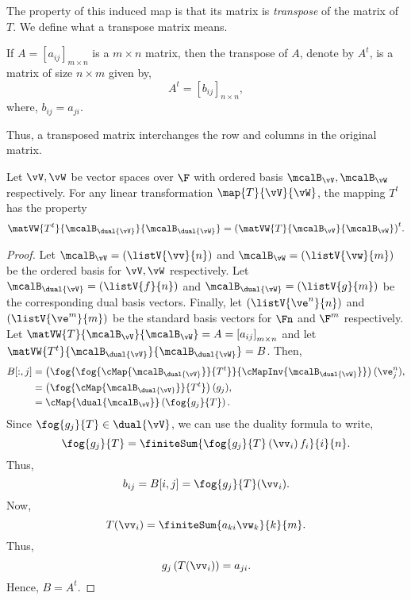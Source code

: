 The property of this induced map is that its matrix is \emph{transpose}
of the matrix of $T$. We define what a transpose matrix means.
\begin{Definition}
    If $A = {\left[a_{ij}\right]}_{m \times n}$ is a $m\times n$ matrix, then the transpose of 
    $A$, denote by $A^{t}$, is a matrix of size $n \times m$ given by,
    \[A^{t} = {\left[b_{ij}\right]}_{n \times n},\]
    where, $b_{ij} = a_{ji}$.
\end{Definition}
Thus, a transposed matrix interchanges the row and columns in the original matrix.
\begin{Theorem}
    Let $\vV,\vW$ be vector spaces over $\F$ with ordered basis $\mcalB_{\vV},\mcalB_{\vW}$ respectively.
    For any linear transformation $\map{T}{\vV}{\vW}$, the mapping $T^{t}$ has the property
    \[\matVW{T^{t}}{\mcalB_{\dual{\vV}}}{\mcalB_{\dual{\vW}}} = 
		{\left(\matVW{T}{\mcalB_{\vV}}{\mcalB_{\vW}}\right)}^{t}.\]
\end{Theorem}
\begin{proof}
    Let $\mcalB_{\vV} = \left(\listV{\vv}{n}\right)$ and $\mcalB_{\vW} = \left(\listV{\vw}{m}\right)$ be the
    ordered basis for $\vV,\vW$ respectively.
    Let $\mcalB_{\dual{\vV}} = \left(\listV{f}{n}\right)$ and 
    $\mcalB_{\dual{\vW}} = \left(\listV{g}{m}\right)$ be the corresponding dual basis vectors.
    Finally, let $\left(\listV{\ve^{n}}{n}\right)$ and $\left(\listV{\ve^{m}}{m}\right)$
    be the standard basis vectors for $\Fn$ and $\F^m$ respectively.
    Let $\matVW{T}{\mcalB_{\vV}}{\mcalB_{\vW}} = A = {\left[a_{ij}\right]}_{m \times n}$ and let
    $\matVW{T^{t}}{\mcalB_{\dual{\vV}}}{\mcalB_{\dual{\vW}}} = B$.
    Then,
    \begin{align*}
	B[:,j] &= 
	\left(\fog{\fog{\cMap{\mcalB_{\dual{\vV}}}}{T^{t}}}{\cMapInv{\mcalB_{\dual{\vW}}}}\right)(\ve^{n}_{j}), \\
	&= \left(\fog{\cMap{\mcalB_{\dual{\vV}}}}{T^{t}}\right)(g_j),\\
	&= \cMap{\dual{\mcalB_{\vV}}}\left(\fog{g_j}{T}\right).\\
    \end{align*}
    Since $\fog{g_j}{T} \in \dual{\vV}$, we can use the duality formula to write,
    \[\fog{g_j}{T} = \finiteSum{\fog{g_j}{T}\left(\vv_i\right)f_i}{i}{n}.\]
    Thus,
    \[b_{ij} = B[i,j] = \fog{g_j}{T}(\vv_i).\]
    Now,
    \[T(\vv_i) = \finiteSum{a_{ki}\vw_{k}}{k}{m}.\]
    Thus,
    \[g_j\left(T(\vv_i)\right) = a_{ji}.\]
    Hence, $B = A^{t}$.

\end{proof}
\endinput

